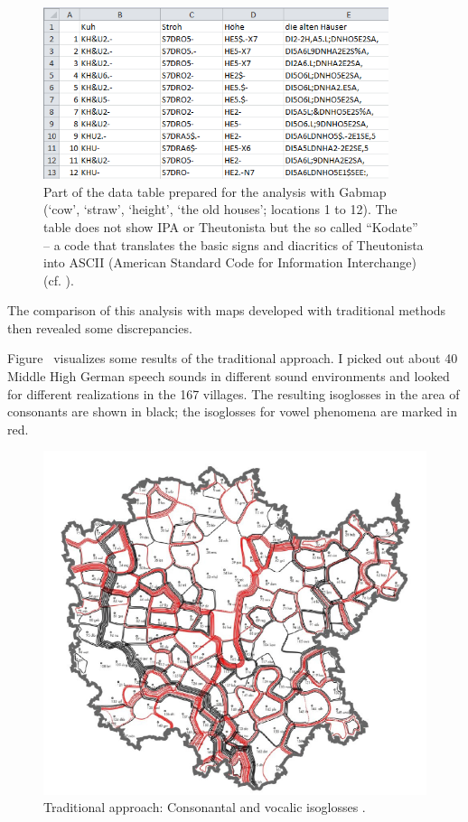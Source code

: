 \documentclass[output=paper]{LSP/langsci}
\begin{document}
\begin{figure}
\includegraphics[width=0.9\textwidth]{illustrations/mathus_fig6}
\caption{Part of the data table prepared for the analysis with Gabmap (`cow', `straw', `height', `the old houses'; locations 1 to 12).
The table does not show IPA or Theutonista but the so called ``Kodate'' – a code that translates the basic signs and diacritics of Theutonista into ASCII (American Standard Code for Information Interchange) (cf. \citealt[38--40]{reichel_elektronische_2013}).}
\label{fig:6}
\end{figure}

The comparison of this analysis with maps developed with traditional methods then revealed some discrepancies.

Figure~ visualizes some results of the traditional approach. I picked out about 40 Middle High German speech sounds in different sound environments and looked for different realizations in the 167 villages. The resulting isoglosses in the area of consonants are shown in black; the isoglosses for vowel phenomena are marked in red.

\begin{figure}
\includegraphics[width=.7\textwidth]{illustrations/mathus_fig7}
\caption{Traditional approach: Consonantal and vocalic isoglosses \citep[107]{mathussek_sprachraume_2014}.}
\label{fig:7}
\end{figure}
\end{document}
